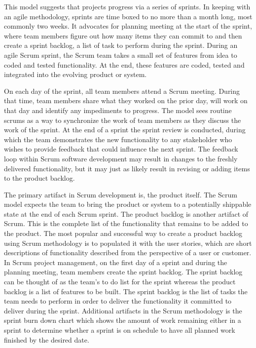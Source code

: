 This model suggests that projects progress via a series of sprints. In keeping with an agile methodology, sprints are time boxed to no more than a month long, most commonly two weeks. It advocates for planning meeting at the start of the sprint, where team members figure out how many items they can commit to and then create a sprint backlog, a list of task to perform during the sprint. During an agile Scrum sprint, the Scrum team takes a small set of features from idea to coded and tested functionality. At the end, these features are coded, tested and integrated into the evolving product or system.

On each day of the sprint, all team members attend a Scrum meeting. During that time, team members share what they worked on the prior day, will work on that day and identify any impediments to progress. The model sees routine scrums as a way to synchronize the work of team members as they discuss the work of the sprint. At the end of a sprint the sprint review is conducted, during which the team demonstrates the new functionality to any stakeholder who wishes to provide feedback that could influence the next sprint. The feedback loop within Scrum software development may result in changes to the freshly delivered functionality, but it may just as likely result in revising or adding items to the product backlog.

The primary artifact in Scrum development is, the product itself. The Scrum model expects the team to bring the product or system to a potentially shippable state at the end of each Scrum sprint. The product backlog is another artifact of Scrum. This is the complete list of the functionality that remains to be added to the product. The most popular and successful way to create a product backlog using Scrum methodology is to populated it with the user stories, which are short descriptions of functionality described from the perspective of a user or customer. In Scrum project management, on the first day of a sprint and during the planning meeting, team members create the sprint backlog. The sprint backlog can be thought of as the team's to do list for the sprint whereas the product backlog is a list of features to be built. The sprint backlog is the list of tasks the team needs to perform in order to deliver the functionality it committed to deliver during the sprint. Additional artifacts in the Scrum methodology is the sprint burn down chart which shows the amount of work remaining either in a sprint to determine whether a sprint is on schedule to have all planned work finished by the desired date.

